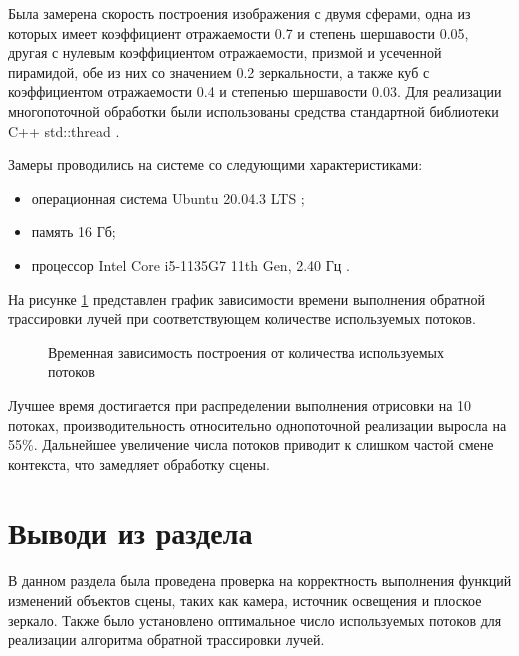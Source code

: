 Была замерена скорость построения изображения с двумя сферами, одна из которых имеет коэффициент отражаемости 0.7 и степень шершавости 0.05, другая с нулевым коэффициентом отражаемости, призмой и усеченной пирамидой, обе из них со значением 0.2 зеркальности, а также куб с коэффициентом отражаемости 0.4 и степенью шершавости 0.03. Для реализации многопоточной обработки были использованы средства стандартной библиотеки C++ std::thread \cite{std_thread}.

Замеры проводились на системе со следующими характеристиками:
\begin{itemize}
	\item операционная система Ubuntu 20.04.3 LTS \cite{ubuntu};
	\item память 16 Гб;
	\item процессор Intel Core i5-1135G7 11th Gen, 2.40 Гц \cite{intel}.
\end{itemize}

На рисунке \ref{graphic} представлен график зависимости времени выполнения обратной трассировки лучей при соответствующем количестве используемых потоков.

\begin{figure}[H]
	\captionsetup{singlelinecheck = false, justification=centering}
	\centering
	\caption{Временная зависимость построения от количества используемых потоков}
	\label{graphic}
\end{figure}

Лучшее время достигается при распределении выполнения отрисовки на 10 потоках, производительность относительно однопоточной реализации выросла на 55\%. Дальнейшее увеличение числа потоков приводит к слишком частой смене контекста, что замедляет обработку сцены.

\section{Выводи из раздела}

В данном раздела была проведена проверка на корректность выполнения функций изменений объектов сцены, таких как камера, источник освещения и плоское зеркало. Также было установлено оптимальное число используемых потоков для реализации алгоритма обратной трассировки лучей.
